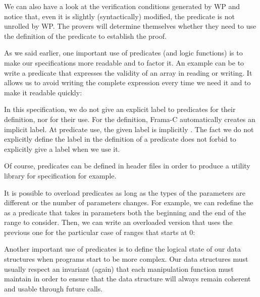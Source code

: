 We can also have a look at the verification conditions generated by WP and
notice that, even it is slightly (syntactically) modified, the predicate is not
unrolled by WP. The provers will determine themselves whether they need to use
the definition of the predicate to establish the proof.






As we said earlier, one important use of predicates (and logic
functions) is to make our specifications more readable and to factor it.
An example can be to write a predicate that expresses the validity of an
array in reading or writing. It allows us to avoid writing the complete
expression every time we need it and to make it readable quickly:






In this specification, we do not give an explicit label to predicates
for their definition, nor for their use. For the definition, Frama-C
automatically creates an implicit label. At predicate use, the given
label is implicitly . The fact we do not explicitly define
the label in the definition of a predicate does not forbid to explicitly
give a label when we use it.

Of course, predicates can be defined in header files in order to produce
a utility library for specification for example.






It is possible to overload predicates as long as the types of the
parameters are different or the number of parameters changes. For
example, we can redefine the  as a
predicate that takes in parameters both the beginning and the end
of the range to consider. Then, we can write an overloaded version that
uses the previous one for the particular case of ranges that starts
at 0:









Another important use of predicates is to define the logical state of
our data structures when programs start to be more complex. Our data
structures must usually respect an invariant (again) that each
manipulation function must maintain in order to ensure that the data
structure will always remain coherent and usable through future calls.



